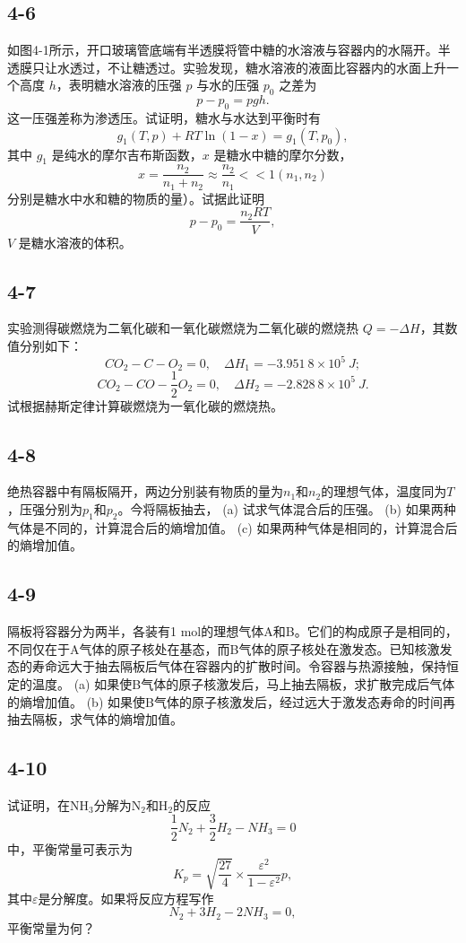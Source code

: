 \newpage
\subsection{4-6}
如图4-1所示，开口玻璃管底端有半透膜将管中糖的水溶液与容器内的水隔开。半透膜只让水透过，不让糖透过。实验发现，糖水溶液的液面比容器内的水面上升一个高度 $h$，表明糖水溶液的压强 $p$ 与水的压强 $p_0$ 之差为
$$ p-p_0 = pgh. $$
这一压强差称为渗透压。试证明，糖水与水达到平衡时有
$$ g_1(T,p) + RT\ln(1-x) = g_1(T,p_0), $$
其中 $g_1$ 是纯水的摩尔吉布斯函数，$x$ 是糖水中糖的摩尔分数，
$$ x = \frac{n_2}{n_1+n_2} \approx \frac{n_2}{n_1} << 1(n_1,n_2) $$
分别是糖水中水和糖的物质的量）。试据此证明
$$ p-p_0 = \frac{n_2RT}{V}, $$
$V$ 是糖水溶液的体积。

\newpage
\subsection{4-7}
实验测得碳燃烧为二氧化碳和一氧化碳燃烧为二氧化碳的燃烧热 $Q=-\Delta H$，其数值分别如下：
$$ CO_2-C-O_2=0, \quad \Delta H_1=-3.951\ 8\times10^5\ J; $$
$$ CO_2-CO-\frac{1}{2}O_2=0, \quad \Delta H_2=-2.828\ 8\times10^5\ J. $$
试根据赫斯定律计算碳燃烧为一氧化碳的燃烧热。

\newpage
\subsection{4-8}
绝热容器中有隔板隔开，两边分别装有物质的量为$n_1$和$n_2$的理想气体，温度同为$T$，压强分别为$p_1$和$p_2$。今将隔板抽去，
(a) 试求气体混合后的压强。
(b) 如果两种气体是不同的，计算混合后的熵增加值。
(c) 如果两种气体是相同的，计算混合后的熵增加值。

\newpage
\subsection{4-9}
隔板将容器分为两半，各装有1 mol的理想气体A和B。它们的构成原子是相同的，不同仅在于A气体的原子核处在基态，而B气体的原子核处在激发态。已知核激发态的寿命远大于抽去隔板后气体在容器内的扩散时间。令容器与热源接触，保持恒定的温度。
(a) 如果使B气体的原子核激发后，马上抽去隔板，求扩散完成后气体的熵增加值。
(b) 如果使B气体的原子核激发后，经过远大于激发态寿命的时间再抽去隔板，求气体的熵增加值。

\newpage
\subsection{4-10}
试证明，在NH$_3$分解为N$_2$和H$_2$的反应
$$ \frac{1}{2} N_2 + \frac{3}{2} H_2 - NH_3 = 0 $$
中，平衡常量可表示为
$$ K_p = \sqrt{\frac{27}{4}} \times \frac{\varepsilon^2}{1-\varepsilon^{2}}p, $$
其中$\varepsilon$是分解度。如果将反应方程写作
$$ N_2 + 3H_2 - 2NH_3 = 0, $$
平衡常量为何？

